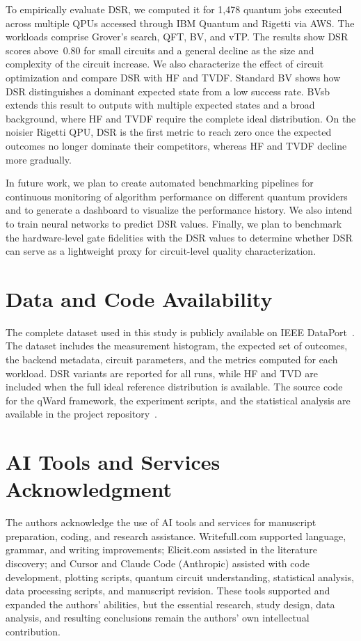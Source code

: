 \documentclass[10pt,conference]{IEEEtran}
\begin{document}
To empirically evaluate DSR, we computed it for 1{,}478 quantum jobs executed across multiple QPUs accessed through IBM Quantum and Rigetti via AWS. The workloads comprise Grover’s search, QFT, BV, and vTP. The results show DSR scores above~$0.80$ for small circuits and a general decline as the size and complexity of the circuit increase. We also characterize the effect of circuit optimization and compare DSR with HF and TVDF. Standard BV shows how DSR distinguishes a dominant expected state from a low success rate. BVsb extends this result to outputs with multiple expected states and a broad background, where HF and TVDF require the complete ideal distribution. On the noisier Rigetti QPU, DSR is the first metric to reach zero once the expected outcomes no longer dominate their competitors, whereas HF and TVDF decline more gradually.

In future work, we plan to create automated benchmarking pipelines for continuous monitoring of algorithm performance on different quantum providers and to generate a dashboard to visualize the performance history. We also intend to train neural networks to predict DSR values. Finally, we plan to benchmark the hardware-level gate fidelities with the DSR values to determine whether DSR can serve as a lightweight proxy for circuit-level quality characterization.

\section{Data and Code Availability}

The complete dataset used in this study is publicly available on IEEE DataPort~\cite{dsrdataset2026}. The dataset includes the measurement histogram, the expected set of outcomes, the backend metadata, circuit parameters, and the metrics computed for each workload. DSR variants are reported for all runs, while HF and TVD are included when the full ideal reference distribution is available. The source code for the qWard framework, the experiment scripts, and the statistical analysis are available in the project repository~\cite{qward2026}.

\section{AI Tools and Services Acknowledgment}

The authors acknowledge the use of AI tools and services for manuscript preparation, coding, and research assistance. Writefull.com supported language, grammar, and writing improvements; Elicit.com assisted in the literature discovery; and Cursor and Claude Code (Anthropic) assisted with code development, plotting scripts, quantum circuit understanding, statistical analysis, data processing scripts, and manuscript revision. These tools supported and expanded the authors’ abilities, but the essential research, study design, data analysis, and resulting conclusions remain the authors’ own intellectual contribution.



\end{document}

